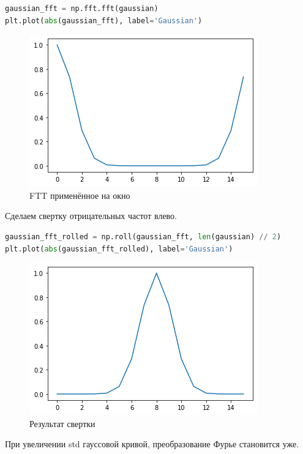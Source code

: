 \begin{lstlisting}[language=Python]
gaussian_fft = np.fft.fft(gaussian)
plt.plot(abs(gaussian_fft), label='Gaussian')
\end{lstlisting}
\begin{figure}[H]
	\begin{center}
		\includegraphics[scale=1]{fig/lab08/lab08_5.png}
		\caption{FTT применённое на окно}
	\end{center}
\end{figure}

Сделаем свертку отрицательных частот влево.

\begin{lstlisting}[language=Python]
gaussian_fft_rolled = np.roll(gaussian_fft, len(gaussian) // 2)
plt.plot(abs(gaussian_fft_rolled), label='Gaussian')
\end{lstlisting}
\begin{figure}[H]
	\begin{center}
		\includegraphics[scale=1]{fig/lab08/lab08_6.png}
		\caption{Результат свертки}
	\end{center}
\end{figure}

При увеличении std гауссовой кривой, преобразование Фурье становится уже.


